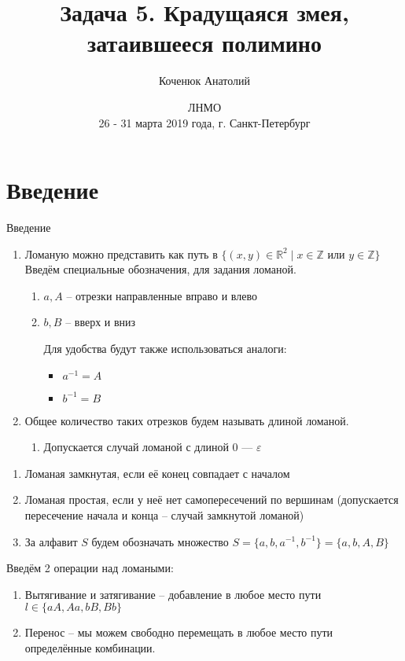 \documentclass[serif, ucs]{beamer}
\title[Крадущаяся змея, затаившееся полимино]{Задача 5. Крадущаяся змея, \newline затаившееся полимино}
\author[VII Санкт-Петербургский Турнир юных математиков]{Коченюк Анатолий}
\date{ЛНМО \\ \vspace{5mm} 26 - 31 марта 2019 года, г. Санкт-Петербург}
\begin{document}
\begin{frame}
\titlepage
\end{frame}

\section[Введение]{Введение}

\begin{frame}{Введение}
	\begin{small}
	\begin{enumerate}
	\item Ломаную можно представить как путь в $\{(x, y)\in\mathds{R}^2\mid x\in \mathds{Z} \text{ или } y\in\mathds{Z}\}$
	Введём специальные обозначения, для задания ломаной.
	\begin{enumerate}
		\item[] $a, A$ -- отрезки направленные вправо и влево
		\item[] $b, B$ -- вверх и вниз
		
		Для удобства будут также использоваться аналоги:
		\begin{itemize}
			\item $a^{-1} = A$
			\item $b^{-1} = B$
		\end{itemize}
	\end{enumerate}
	\item Общее количество таких отрезков будем называть длиной ломаной.
	\begin{enumerate}
		\item []Допускается случай ломаной с длиной 0 --- $\varepsilon$
	\end{enumerate}
	\end{enumerate}	
	\end{small}
	
\end{frame}

\begin{frame}
\begin{enumerate}
	\item Ломаная замкнутая, если её конец совпадает с началом
	\item Ломаная простая, если у неё нет самопересечений по вершинам (допускается пересечение начала и конца -- случай замкнутой ломаной)
	\item За алфавит $S$ будем обозначать множество $S = \{a, b, a^{-1}, b^{-1}\} = \{a, b, A, B\}$ 	
\end{enumerate}

Введём 2 операции над ломаными:
\begin{enumerate}
	\item Вытягивание и затягивание -- добавление в любое место пути $l\in\{aA, Aa, bB, Bb\}$
	\item Перенос -- мы можем свободно перемещать в любое место пути определённые комбинации. 
	\end{enumerate}
\end{frame}
\end{document}
